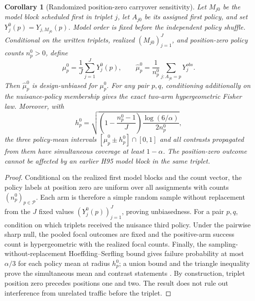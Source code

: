 \documentclass[11pt]{article}
\newcommand{\1}{\mathbf{1}}
\newtheorem{corollary}[proposition]{Corollary}
\begin{document}
\begin{corollary}[Randomized position-zero carryover sensitivity]
\label{cor:h95-position-zero}
Let $M_{j0}$ be the model block scheduled first in triplet $j$, let $A_{j0}$ be
its assigned first policy, and set $Y^0_j(p)=Y_{j,M_{j0}}(p)$.  Model order is
fixed before the independent policy shuffle.  Conditional on the written
triplets, realized $(M_{j0})_{j=1}^J$, and position-zero policy counts
$n_p^0>0$, define
\begin{equation}
 \mu_p^0=\frac1J\sum_{j=1}^JY_j^0(p),\qquad
 \widehat\mu_p^0=\frac1{n_p^0}\sum_{j:A_{j0}=p}Y_j^{obs}.
 \label{eq:h95-position-zero}
\end{equation}
Then $\widehat\mu_p^0$ is design-unbiased for $\mu_p^0$.  For any pair $p,q$,
conditioning additionally on the nuisance-policy membership gives the exact
two-arm hypergeometric Fisher law.  Moreover, with
\[
 h_p^0=\sqrt{\left(1-\frac{n_p^0-1}{J}\right)
              \frac{\log(6/\alpha)}{2n_p^0}},
\]
the three policy-mean intervals $[\widehat\mu_p^0\pm h_p^0]\cap[0,1]$ and all
contrasts propagated from them have simultaneous coverage at least $1-\alpha$.
The position-zero outcome cannot be affected by an earlier H95 model block in
the same triplet.
\end{corollary}

\begin{proof}
Conditional on the realized first model blocks and the count vector, the policy
labels at position zero are uniform over all assignments with counts
$(n_p^0)_{p\in\mathcal P}$.  Each arm is therefore a simple random sample without
replacement from the $J$ fixed values $(Y_j^0(p))_{j=1}^J$, proving unbiasedness.
For a pair $p,q$, condition on which triplets received the nuisance third policy.
Under the pairwise sharp null, the pooled focal outcomes are fixed and the
positive-arm success count is hypergeometric with the realized focal counts.
Finally, the sampling-without-replacement Hoeffding--Serfling bound gives failure
probability at most $\alpha/3$ for each policy mean at radius $h_p^0$; a union
bound and the triangle inequality prove the simultaneous mean and contrast
statements \citep{serfling1974}.  By construction, triplet position zero precedes
positions one and two.  The result does not rule out interference from unrelated
traffic before the triplet.
\end{proof}
\end{document}
